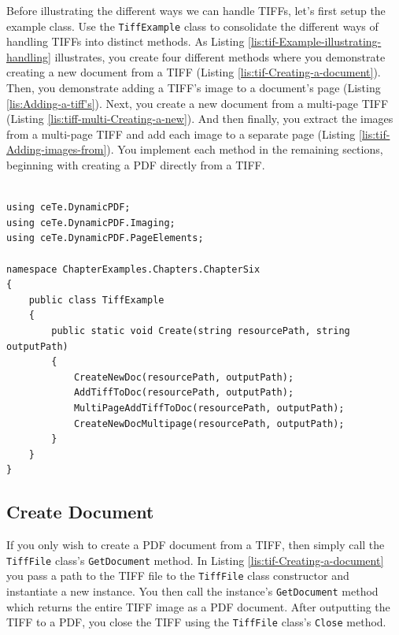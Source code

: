 \documentclass[american,letterpaper]{tufte-book}
\numberwithin{equation}{section}
\numberwithin{figure}{section}
\begin{document}
{{Before illustrating the different ways we can handle TIFFs, let's
first setup the example class. Use the \texttt{TiffExample} class
to consolidate the different ways of handling TIFFs into distinct
methods. As Listing \ref{lis:tif-Example-illustrating-handling} illustrates,
you create four different methods where you demonstrate creating
a new document from a TIFF (Listing \ref{lis:tif-Creating-a-document}).
Then, you demonstrate adding a TIFF's image to a document's page (Listing
\ref{lis:Adding-a-tiff's}). Next, you create a new document from a
multi-page TIFF (Listing \ref{lis:tiff-multi-Creating-a-new}). And
then finally, you extract the images from a multi-page TIFF and add
each image to a separate page (Listing \ref{lis:tif-Adding-images-from}).
You implement each method in the remaining sections, beginning with
creating a PDF directly from a TIFF.

\bgroup{}
\begin{lstlisting}[caption={Handling TIFFs.},label={lis:tif-Example-illustrating-handling},basicstyle={\small\ttfamily},breaklines=true]

using ceTe.DynamicPDF;
using ceTe.DynamicPDF.Imaging;
using ceTe.DynamicPDF.PageElements;

namespace ChapterExamples.Chapters.ChapterSix
{
    public class TiffExample
    {
        public static void Create(string resourcePath, string outputPath)
        {
            CreateNewDoc(resourcePath, outputPath);
            AddTiffToDoc(resourcePath, outputPath);
            MultiPageAddTiffToDoc(resourcePath, outputPath);
            CreateNewDocMultipage(resourcePath, outputPath);
        }
    }
}
\end{lstlisting}
\leavevmode\egroup


\subsection{Create Document}

If you only wish to create a PDF document from a TIFF, then simply
call the \texttt{TiffFile} class's \texttt{GetDocument} method. In
Listing \ref{lis:tif-Creating-a-document} you pass a path to the TIFF
file to the \texttt{TiffFile} class constructor and instantiate a
new instance. You then call the instance's \texttt{GetDocument} method
which returns the entire TIFF image as a PDF document. After outputting
the TIFF to a PDF, you close the TIFF using the \texttt{TiffFile} class's
\texttt{Close} method.

}}
\end{document}

